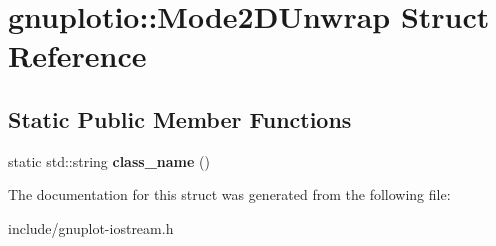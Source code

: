 \hypertarget{structgnuplotio_1_1Mode2DUnwrap}{}\section{gnuplotio\+:\+:Mode2\+D\+Unwrap Struct Reference}
\label{structgnuplotio_1_1Mode2DUnwrap}
\subsection*{Static Public Member Functions}
\begin{DoxyCompactItemize}
\item 
\mbox{\label{structgnuplotio_1_1Mode2DUnwrap_ab2f533c9ceb52cfecaa161c64316deb9}} 
static std\+::string {\bfseries class\+\_\+name} ()
\end{DoxyCompactItemize}


The documentation for this struct was generated from the following file\+:\begin{DoxyCompactItemize}
\item 
include/gnuplot-\/iostream.\+h\end{DoxyCompactItemize}
